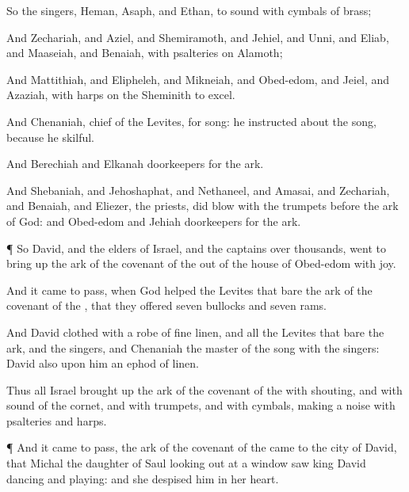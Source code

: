 {So the
singers,
Heman,
Asaph, and
Ethan,
{} to
sound with
cymbals of
brass;

And
Zechariah, and
Aziel, and
Shemiramoth, and
Jehiel, and
Unni, and
Eliab, and
Maaseiah, and
Benaiah, with
psalteries on
Alamoth;

And
Mattithiah, and
Elipheleh, and
Mikneiah, and
Obed-edom, and
Jeiel, and
Azaziah, with
harps on the
Sheminith to
excel.

And
Chenaniah,
chief of the
Levites,
{} for
song: he
instructed about the
song, because he
{}
skilful.

And
Berechiah and
Elkanah
{}
doorkeepers for the
ark.

And
Shebaniah, and
Jehoshaphat, and
Nethaneel, and
Amasai, and
Zechariah, and
Benaiah, and
Eliezer, the
priests, did
blow with the
trumpets
before the
ark of
God: and
Obed-edom and
Jehiah
{}
doorkeepers for the
ark.


\par }{\PP {}¶ So
David, and the
elders of
Israel, and the
captains over
thousands,
went to bring
up the
ark of the
covenant of the
{} out of the
house of
Obed-edom with
joy.

And it came to pass, when
God
helped the
Levites that
bare the
ark of the
covenant of the
{}, that they
offered
seven
bullocks and
seven
rams.

And
David
{}
clothed with a
robe of fine
linen, and all the
Levites that
bare the
ark, and the
singers, and
Chenaniah the
master of the
song with the
singers:
David also
{} upon him an
ephod of
linen.

Thus all
Israel brought
up the
ark of the
covenant of the
{} with
shouting, and with
sound of the
cornet, and with
trumpets, and with
cymbals, making a
noise with
psalteries and
harps.


\par }{\PP {}¶ And it came to pass,
{} the
ark of the
covenant of the
{}
came to the
city of
David, that
Michal the
daughter of
Saul looking
out at a
window
saw
king
David
dancing and
playing: and she
despised him in her
heart.




}
